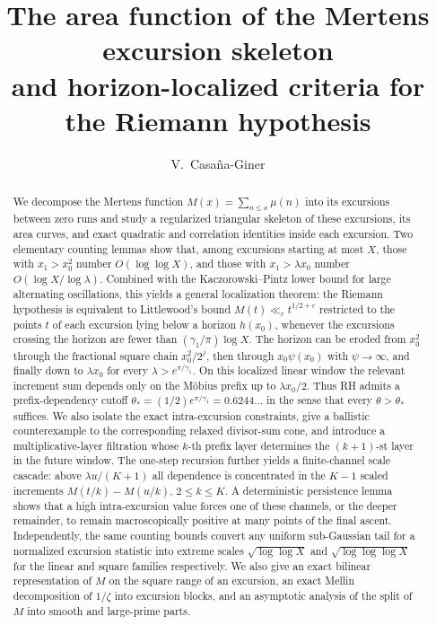 \documentclass[11pt]{amsart}
\title[The Mertens excursion skeleton]{The area function of the Mertens excursion skeleton\\
and horizon-localized criteria for the Riemann hypothesis}
\author{V.~Casa\~na-Giner}
\date{}
\numberwithin{equation}{section}
\theoremstyle{plain}
\theoremstyle{definition}
\theoremstyle{remark}
\newcommand{\eps}{\varepsilon}
\begin{document}
\begin{abstract}
We decompose the Mertens function $M(x)=\sum_{n\le x}\mu(n)$ into its
excursions between zero runs and study a regularized triangular skeleton of
these excursions, its area curves, and exact quadratic and correlation
identities inside each excursion. Two elementary counting lemmas show that,
among excursions starting at most $X$, those with $x_1>x_0^2$ number
$O(\log\log X)$, and those with $x_1>\lambda x_0$ number
$O(\log X/\log\lambda)$. Combined with the Kaczorowski--Pintz lower bound for
large alternating oscillations, this yields a general localization theorem:
the Riemann hypothesis is equivalent to Littlewood's bound
$M(t)\ll_\eps t^{1/2+\eps}$ restricted to the points $t$ of each excursion
lying below a horizon $h(x_0)$, whenever the excursions crossing the horizon
are fewer than $(\gamma_1/\pi)\log X$. The horizon can be eroded from $x_0^2$ through the fractional square
chain $x_0^2/2^j$, then through $x_0\psi(x_0)$ with $\psi\to\infty$, and
finally down to $\lambda x_0$ for every
$\lambda>e^{\pi/\gamma_1}$. On this localized linear window the relevant
increment sum depends only on the M\"obius prefix up to $\lambda x_0/2$.
Thus RH admits a prefix-dependency cutoff
$\theta_*=(1/2)e^{\pi/\gamma_1}=0.6244\ldots$ in the sense that every
$\theta>\theta_*$ suffices. We also isolate the exact intra-excursion
constraints, give a ballistic counterexample to the corresponding relaxed
divisor-sum cone, and introduce a multiplicative-layer filtration whose
$k$-th prefix layer determines the $(k+1)$-st layer in the future window.  The one-step
recursion further yields a finite-channel scale cascade: above
$\lambda u/(K+1)$ all dependence is concentrated in the $K-1$ scaled
increments $M(t/k)-M(u/k)$, $2\le k\le K$.  A deterministic persistence
lemma shows that a high intra-excursion value forces one of these channels,
or the deeper remainder, to remain macroscopically positive at many points
of the final ascent. Independently, the same
counting bounds convert any uniform sub-Gaussian tail for a normalized
excursion statistic into extreme scales $\sqrt{\log\log X}$ and
$\sqrt{\log\log\log X}$ for the linear and square families respectively. We
also give an exact bilinear representation of $M$ on the square range of an
excursion, an exact Mellin decomposition of $1/\zeta$ into excursion blocks,
and an asymptotic analysis of the split of $M$ into smooth and large-prime
parts.
\end{abstract}

\maketitle
\end{document}
